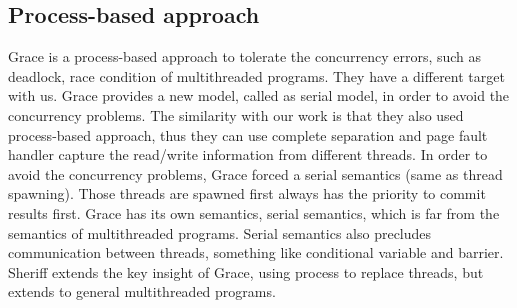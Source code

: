 \subsection{Process-based approach}

Grace is a process-based approach to tolerate the concurrency errors, such as deadlock, 
race condition of multithreaded programs. They have a different target with us. 
Grace provides a new model, called as serial model, in order to avoid the concurrency problems. 
The similarity with our work is that they also used process-based approach, thus they can use complete separation 
and page fault handler capture the read/write information from different threads. 
In order to avoid the concurrency problems, Grace forced a serial semantics (same as thread spawning). 
Those threads are spawned first always has the priority to commit results first.
Grace has its own semantics, serial semantics, which is far from the semantics of multithreaded programs. 
Serial semantics also precludes communication between threads, something like conditional variable and barrier. 
Sheriff extends the key insight of Grace, using process to replace threads, but extends to general multithreaded 
programs. 
